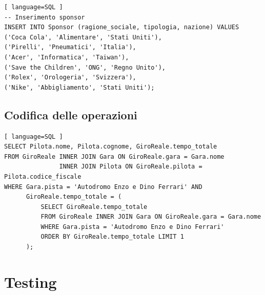 \documentclass[11pt]{article}
\begin{document}
\begin{lstlisting}[ language=SQL ]
-- Inserimento sponsor
INSERT INTO Sponsor (ragione_sociale, tipologia, nazione) VALUES 
('Coca Cola', 'Alimentare', 'Stati Uniti'),
('Pirelli', 'Pneumatici', 'Italia'),
('Acer', 'Informatica', 'Taiwan'),
('Save the Children', 'ONG', 'Regno Unito'),
('Rolex', 'Orologeria', 'Svizzera'),
('Nike', 'Abbigliamento', 'Stati Uniti');
\end{lstlisting}

\subsection{Codifica delle operazioni}

\begin{lstlisting}[ language=SQL ]
SELECT Pilota.nome, Pilota.cognome, GiroReale.tempo_totale
FROM GiroReale INNER JOIN Gara ON GiroReale.gara = Gara.nome
               INNER JOIN Pilota ON GiroReale.pilota = Pilota.codice_fiscale
WHERE Gara.pista = 'Autodromo Enzo e Dino Ferrari' AND
      GiroReale.tempo_totale = (
          SELECT GiroReale.tempo_totale
          FROM GiroReale INNER JOIN Gara ON GiroReale.gara = Gara.nome
          WHERE Gara.pista = 'Autodromo Enzo e Dino Ferrari'
          ORDER BY GiroReale.tempo_totale LIMIT 1
      );
\end{lstlisting}



\section{Testing}
\end{document}
